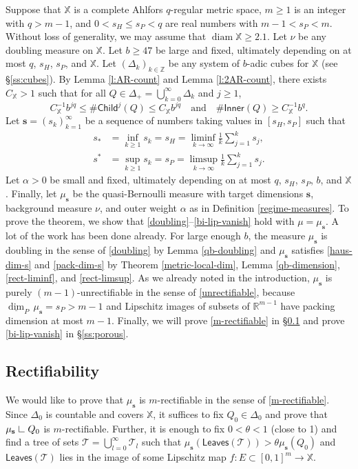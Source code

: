 \documentclass[12pt]{amsart}
\theoremstyle{definition}
\theoremstyle{remark}
\newcommand{\RR}{\mathbb{R}}
\newcommand{\ZZ}{\mathbb{Z}}
\newcommand{\XX}{\mathbb{X}}
\newcommand{\diam}{\mathop\mathrm{diam}\nolimits}
\newcommand{\res}{\hbox{ {\vrule height .22cm}{\leaders\hrule\hskip.2cm} }} %
\newcommand{\muse}{\mu_{\mathbf{s}}}
\newcommand{\leaves}{\mathsf{Leaves}}
\newcommand{\Child}{\mathsf{Child}}
\newcommand{\Inner}{\mathsf{Inner}}
\numberwithin{figure}{section}
\numberwithin{equation}{section}
\begin{document}
Suppose that $\XX$ is a complete Ahlfors $q$-regular metric space, $m\geq 1$ is an integer with $q>m-1$, and $0<s_H\leq s_P<q$ are real numbers with $m-1<s_P< m$. Without loss of generality, we may assume that $\diam\XX\geq 2.1$. Let $\nu$ be any doubling measure on $\XX$. Let $b\geq 47$ be large and fixed, ultimately depending on at most $q$, $s_H$, $s_P$, and $\XX$. Let $(\Delta_k)_{k\in\ZZ}$ be any system of $b$-adic cubes for $\XX$ (see \S\ref{ss:cubes}). By Lemma \ref{l:AR-count} and Lemma \ref{l:2AR-count}, there exists $C_\XX>1$ such that for all $Q\in\Delta_+=\bigcup_{k=0}^\infty\Delta_k$ and $j\geq 1$, \begin{equation}\label{card-bound} C_\XX^{-1} b^{jq}\leq \#\Child^j(Q)\leq C_\XX b^{jq}\quad\text{and}\quad \#\Inner(Q)\geq C_\XX^{-1} b^q.\end{equation} Let $\mathbf{s}=(s_k)_{k=1}^\infty$ be a sequence of numbers taking values in $[s_H,s_P]$ such that \begin{align}
s_*&=\inf_{k\geq 1}s_k=s_H=\liminf_{k\rightarrow\infty} \frac{1}{k}\sum_{j=1}^k s_j, \label{rect-liminf}\\
s^*&=\sup_{k\geq 1}s_k=s_P=\limsup_{k\rightarrow\infty} \frac{1}{k}\sum_{j=1}^k s_j. \label{rect-limsup}\end{align} Let $\alpha>0$ be small and fixed, ultimately depending on at most $q$, $s_H$, $s_P$, $b$, and $\XX$. Finally, let $\muse$ be the quasi-Bernoulli measure with target dimensions $\mathbf{s}$, background measure $\nu$, and outer weight $\alpha$ as in Definition \ref{regime-measures}. To prove the theorem, we show that \eqref{doubling}--\eqref{bi-lip-vanish} hold with $\mu=\muse$. A lot of the work has been done already. For large enough $b$, the measure $\muse$ is doubling in the sense of \eqref{doubling} by Lemma \ref{qb-doubling} and $\muse$ satisfies \eqref{haus-dim-s} and \eqref{pack-dim-s} by Theorem \ref{metric-local-dim}, Lemma \ref{qb-dimension}, \eqref{rect-liminf}, and \eqref{rect-limsup}. As we already noted in the introduction, $\muse$ is purely $(m-1)$-unrectifiable in the sense of \eqref{unrectifiable}, because $\underline{\dim}_P\,\muse=s_P>m-1$ and Lipschitz images of subsets of $\RR^{m-1}$ have packing dimension at most $m-1$. Finally, we will prove \eqref{m-rectifiable} in \S\ref{ss:simple} and prove \eqref{bi-lip-vanish} in \S\ref{ss:porous}.

\subsection{Rectifiability}\label{ss:simple}
We would like to prove that $\muse$ is  $m$-rectifiable in the sense of \eqref{m-rectifiable}. Since $\Delta_0$ is countable and covers $\XX$, it suffices to fix $Q_0\in\Delta_0$ and prove that $\muse\res Q_0$ is $m$-rectifiable. Further, it is enough to fix $0<\theta<1$ (close to 1) and find a tree of sets $\mathcal{T}=\bigcup_{l=0}^\infty \mathcal{T}_l$ such that $\muse(\leaves(\mathcal{T}))>\theta\muse(Q_0)$ and $\leaves(\mathcal{T})$ lies in the image of some Lipschitz map $f:E\subset[0,1]^m\rightarrow\XX$.
\end{document}
